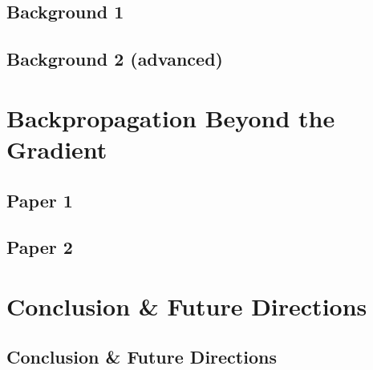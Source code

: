 \chapter{Background 1}\label{chap:background-1}


\setchapterpreamble[u]{\margintoc}
\chapter{Background 2 (advanced)}\label{chap:background-2}



\part{Backpropagation Beyond the Gradient}\label{part:papers}

\setchapterpreamble[u]{\margintoc}
\chapter{Paper 1}\label{chap:paper-1}


\setchapterpreamble[u]{\margintoc}
\chapter{Paper 2}\label{chap:paper-2}




\part{Conclusion \& Future Directions}\label{part:conclusion}

\setchapterpreamble[u]{\margintoc}
\chapter{Conclusion \& Future Directions}\label{chap:conclusion}



\appendix %

